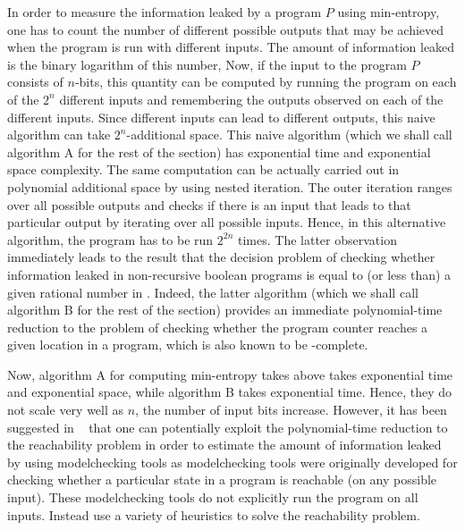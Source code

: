  
 

In order to measure the information leaked by a program $P$ using min-entropy, one has to count the number of different possible outputs that may be achieved when the program is run with different inputs. The amount of information leaked is the binary logarithm of this number, 
Now, if the  input to the program $P$ consists of $n$-bits, this quantity can be computed by running the program on each of the  $2^n$ different inputs and remembering the outputs observed on each of the different inputs.  Since different inputs can lead to different outputs, this naive algorithm can take $2^n$-additional space.
This naive algorithm (which we shall call algorithm A for the rest of the section) has exponential time and exponential space complexity.  The same computation can be actually carried out in polynomial additional space by using nested iteration.
The outer iteration ranges over  all possible outputs and checks if there is an input that leads to that particular output by iterating over all possible inputs. Hence, in this alternative algorithm, the program has to be run $2^{2n}$ times.  The latter observation  immediately leads to the result that  the decision problem of checking whether information leaked  in non-recursive boolean programs is  equal to (or less than) a given rational number in {\PSpace}. Indeed, the latter algorithm (which we shall call algorithm B for the rest of the section)  provides an immediate polynomial-time reduction to the problem of checking whether the program counter reaches a given location in a program, which is also known to be {\PSpace}-complete.  


Now,  algorithm A for computing min-entropy takes above takes  exponential time and exponential space, while  algorithm B takes exponential time. Hence, they do not scale
very well  as $n$, the number of input bits increase.  However, it has been suggested in 
~\cite{POST} that one can potentially exploit the polynomial-time reduction to the reachability problem in order to estimate the amount of information leaked by using modelchecking tools as modelchecking tools were originally developed for checking whether a particular state in a program is reachable (on any possible input). These modelchecking tools do not explicitly run the program on all inputs. Instead use a variety of heuristics to solve the reachability problem. 


